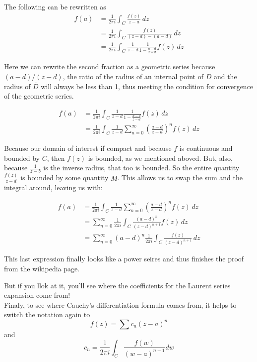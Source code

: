 The following can be rewritten as
\begin{align*}
f(a) &= \frac{1}{2\pi i} \int_{C} \frac{f(z)}{z - a} \, dz \\
&= \frac{1}{2\pi i} \int_{C} \frac{f(z)}{\left(z-d\right) - \left(a-d\right)} \, dz \\
&= \frac{1}{2\pi i} \int_{C} \frac{1}{z-d} \frac{1}{1 - \frac{a-d}{z-d}} f(z) \, dz
\end{align*}

Here we can rewrite the second fraction as a geometric series because
$\left(a-d\right)/\left(z-d\right)$,
the ratio of the radius of an internal point of $D$ and the radius of $\bar{D}$ will always be less
than 1, thus meeting the condition for convergence of the geometric series.

\begin{align*}
f(a) &= \frac{1}{2\pi i} \int_{C} \frac{1}{z-d} \frac{1}{1 - \frac{a-d}{z-d}} f(z) \, dz \\
&= \frac{1}{2\pi i} \int_{C} \frac{1}{z-d} 
    \sum_{n=0}^{\infty} \left( \frac{a-d}{z-d} \right)^n
    f(z) \, dz 
\end{align*}

Because our domain of interest if compact and because $f$ is continuous and bounded by $C$, then $f(z)$ is
bounded, as we mentioned aboved.
But, also, because $\frac{1}{z-b}$ is the inverse radius, that too is bounded.
So the entire quantity $\frac{f(z)}{z-d}$ is bounded by some quantity $M$.
This allows us to swap the sum and the integral around, leaving us with:

\begin{align*}
f(a) &= \frac{1}{2\pi i} \int_{C} \frac{1}{z-d} 
    \sum_{n=0}^{\infty} \left( \frac{a-d}{z-d} \right)^n
    f(z) \, dz \\
&= \sum_{n=0}^{\infty} \frac{1}{2\pi i}
    \int_{C} \frac{ \left(a-d\right)^n }{ \left(z-d\right)^{n+1} } f(z) \, dz \\
&= \sum_{n=0}^{\infty} \left(a-d\right)^n \frac{1}{2\pi i}
    \int_{C} \frac{f(z)}{ \left(z-d\right)^{n+1} } \, dz
\end{align*}

This last expression finally looks like a power seires and thus finishes the proof from the wikipedia page.

But if you llok at it, you'll see where the coefficients for the Laurent series expansion come from!
\\

Finaly, to see where Cauchy's differentiation formula comes from, it helps to switch the notation again
to
$$
f(z) = \sum c_n \left(z-a\right)^n
$$
and
$$
c_n = \frac{1}{2 \pi i} \int_C \frac{f(w)}{\left(w-a\right)^{n+1}} dw
$$

